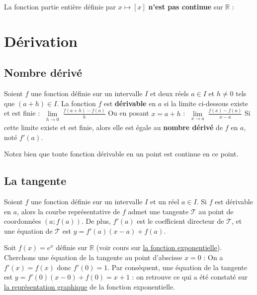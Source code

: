 	La fonction partie entière définie par $x \mapsto [x]$ \textbf{n'est pas continue} sur $\mathbb{R}$ :
	
	
	\section{Dérivation}
	
	\subsection{Nombre dérivé}
	
	\begin{formula}[Définition]
		Soient $f$ une fonction définie sur un intervalle $I$ et deux réels $a \in I$ et $h \neq 0$ tels que $(a + h) \in I$.
		\newpar
		La fonction $f$ est \textbf{dérivable} en $a$ si la limite ci-dessous existe et est finie :
		\newpar
		$\displaystyle{\lim\limits_{\substack{h \rightarrow 0}} \frac{f(a + h) - f(a)}{h}}$
		\newpar
		Ou en posant $x = a + h$ :
		\newpar
		$\displaystyle{\lim\limits_{\substack{x \rightarrow a}} \frac{f(x) - f(a)}{x-a}}$
		\newpar
		Si cette limite existe et est finie, alors elle est égale au \textbf{nombre dérivé} de $f$ en $a$, noté $f'(a)$.
	\end{formula}
	
	\begin{tip}[Remarque]
		Notez bien que toute fonction dérivable en un point est continue en ce point.
	\end{tip}
	
	\subsection{La tangente}
	
	\begin{formula}
		Soient $f$ une fonction définie sur un intervalle $I$ et un réel $a \in I$. Si $f$ est dérivable en $a$, alors la courbe représentative de $f$ admet une tangente $\mathcal{T}$ au point de coordonnées $(a; f(a))$.
		\newpar
		De plus, $f'(a)$ est le coefficient directeur de $\mathcal{T}$, et une équation de $\mathcal{T}$ est $y = f'(a)(x-a)+f(a)$.
	\end{formula}
	
	\begin{tip}[Exemple]
		Soit $f(x) = e^x$ définie sur $\mathbb{R}$ (voir cours sur \href{https://bacomathiqu.es/cours/premiere/fonction-exponentielle/}{la fonction exponentielle}).
		\newpar
		Cherchons une équation de la tangente au point d'abscisse $x = 0$ :
		\newpar
		On a $f'(x) = f(x)$ donc $f'(0) = 1$.
		\newpar
		Par conséquent, une équation de la tangente est $y = f'(0)(x-0)+f(0) = x + 1$ :
		on retrouve ce qui a été constaté sur \href{https://bacomathiqu.es/cours/premiere/fonction-exponentielle/#3-représentation-graphique}{la représentation graphique} de la fonction exponentielle.
	\end{tip}
	

